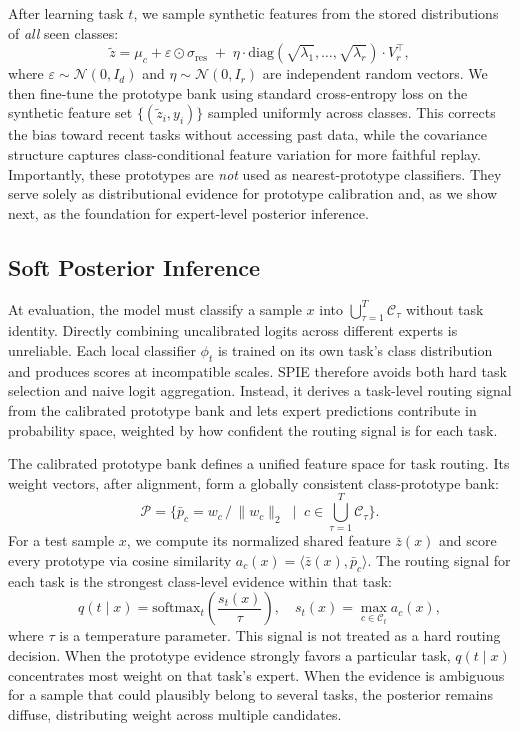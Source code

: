 After learning task $t$, we sample synthetic features from the stored distributions of \emph{all} seen classes:
\begin{equation}
\tilde{z} = \mu_c + \varepsilon \odot \sigma_{\text{res}} \;+\; \eta \cdot \text{diag}(\sqrt{\lambda_1}, \dots, \sqrt{\lambda_r}) \cdot V_r^\top,
\label{eq:sampling}
\end{equation}
where $\varepsilon \sim \mathcal{N}(0, I_d)$ and $\eta \sim \mathcal{N}(0, I_r)$ are independent random vectors. We then fine-tune the prototype bank using standard cross-entropy loss on the synthetic feature set $\{(\tilde{z}_i, y_i)\}$ sampled uniformly across classes. This corrects the bias toward recent tasks without accessing past data, while the covariance structure captures class-conditional feature variation for more faithful replay. Importantly, these prototypes are \emph{not} used as nearest-prototype classifiers. They serve solely as distributional evidence for prototype calibration and, as we show next, as the foundation for expert-level posterior inference.

\subsection{Soft Posterior Inference}
\label{sec:posterior}

At evaluation, the model must classify a sample $x$ into $\bigcup_{\tau=1}^{T} \mathcal{C}_\tau$ without task identity. Directly combining uncalibrated logits across different experts is unreliable. Each local classifier $\phi_t$ is trained on its own task's class distribution and produces scores at incompatible scales. SPIE therefore avoids both hard task selection and naive logit aggregation. Instead, it derives a task-level routing signal from the calibrated prototype bank and lets expert predictions contribute in probability space, weighted by how confident the routing signal is for each task.

The calibrated prototype bank defines a unified feature space for task routing. Its weight vectors, after alignment, form a globally consistent class-prototype bank:
\begin{equation}
\mathcal{P} = \big\{ \bar{p}_c = w_c\,/\,\|w_c\|_2 \;\mid\; c \in \textstyle\bigcup_{\tau=1}^{T} \mathcal{C}_\tau \big\}.
\label{eq:protobank}
\end{equation}
For a test sample $x$, we compute its normalized shared feature $\bar{z}(x)$ and score every prototype via cosine similarity $a_c(x) = \langle \bar{z}(x), \bar{p}_c \rangle$. The routing signal for each task is the strongest class-level evidence within that task:
\begin{equation}
q(t \mid x) = \text{softmax}_t\!\left( \frac{s_t(x)}{\tau} \right), \quad s_t(x) = \max_{c \in \mathcal{C}_t} a_c(x),
\label{eq:task_posterior}
\end{equation}
where $\tau$ is a temperature parameter. This signal is not treated as a hard routing decision. When the prototype evidence strongly favors a particular task, $q(t \mid x)$ concentrates most weight on that task's expert. When the evidence is ambiguous for a sample that could plausibly belong to several tasks, the posterior remains diffuse, distributing weight across multiple candidates.

